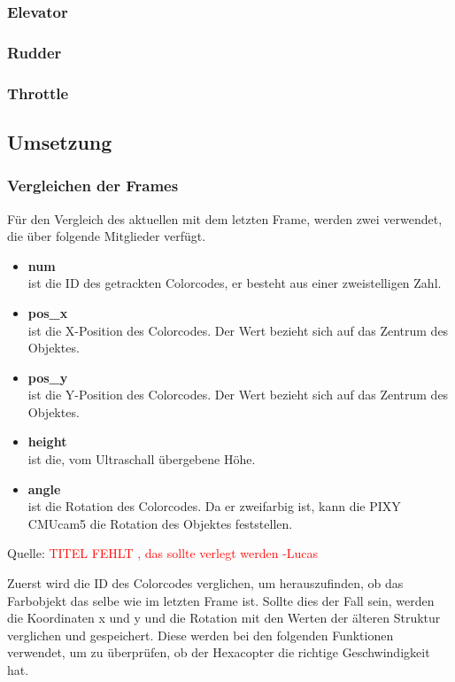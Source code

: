 \begin{itemize}
    \subsubsection{Elevator}
    \subsubsection{Rudder}


    \subsubsection{Throttle}

  \subsection{Umsetzung}

    \subsubsection{Vergleichen der Frames}
    Für den Vergleich des aktuellen mit dem letzten Frame, werden zwei  verwendet, die über folgende Mitglieder verfügt.
    \begin{itemize}
      \item \textbf{num}\\
      ist die ID des getrackten Colorcodes, er besteht aus einer zweistelligen Zahl.
      \item \textbf{pos\_x}\\
      ist die X-Position des Colorcodes. Der Wert bezieht sich auf das Zentrum des Objektes.
      \item \textbf{pos\_y}\\
      ist die Y-Position des Colorcodes. Der Wert bezieht sich auf das Zentrum des Objektes.
      \item \textbf{height}\\
      ist die, vom Ultraschall übergebene Höhe.
      \item \textbf{angle}\\
      ist die Rotation des Colorcodes. Da er zweifarbig ist, kann die PIXY CMUcam5 die Rotation des Objektes feststellen.
    \end{itemize}

    Quelle: \textcolor{red}{TITEL FEHLT \cite{Structs}, das sollte verlegt werden -Lucas}

    Zuerst wird die ID des Colorcodes verglichen, um herauszufinden, ob das Farbobjekt das selbe wie im letzten Frame ist.
    Sollte dies der Fall sein, werden die Koordinaten x und y und die Rotation mit den Werten der älteren Struktur verglichen und gespeichert.
    Diese werden bei den folgenden Funktionen verwendet, um zu überprüfen, ob der Hexacopter die richtige Geschwindigkeit hat.


\end{itemize}
